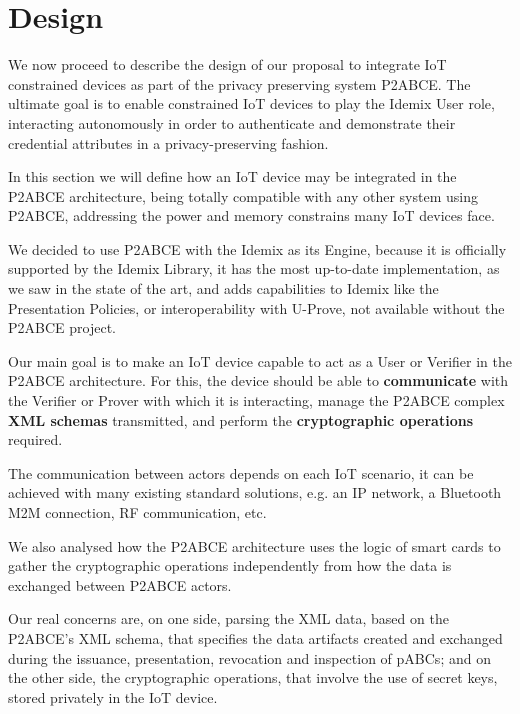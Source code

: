 \documentclass[journal]{IEEEtran}
\begin{document}
\section{Design}\label{ch:design}

We now proceed to describe the design of our proposal to integrate IoT constrained devices as part of the privacy preserving system P2ABCE. The ultimate goal is to enable constrained IoT devices to play the Idemix User role, interacting autonomously in order to authenticate and demonstrate their credential attributes in a privacy-preserving fashion.

In this section we will define how an IoT device may be integrated in the P2ABCE architecture, being totally compatible with any other system using P2ABCE, addressing the power and memory constrains many IoT devices face.

We decided to use P2ABCE with the Idemix as its Engine, because it is officially supported by the Idemix Library, it has the most up-to-date implementation, as we saw in the state of the art, and adds capabilities to Idemix like the Presentation Policies, or interoperability with U-Prove, not available without the P2ABCE project.

Our main goal is to make an IoT device capable to act as a User or Verifier in the P2ABCE architecture. For this, the device should be able to \textbf{communicate} with the Verifier or Prover with which it is interacting, manage the P2ABCE complex \textbf{XML schemas} transmitted, and perform the \textbf{cryptographic operations} required.

The communication between actors depends on each IoT scenario, it can be achieved with many existing standard solutions, e.g. an IP network, a Bluetooth M2M connection, RF communication, etc.

We also analysed how the P2ABCE architecture uses the logic of smart cards to gather the cryptographic operations independently from how the data is exchanged between P2ABCE actors.

Our real concerns are, on one side, parsing the XML data, based on the P2ABCE's XML schema, that specifies the data artifacts created and exchanged during the issuance, presentation, revocation and inspection of pABCs; and on the other side, the cryptographic operations, that involve the use of secret keys, stored privately in the IoT device.

\end{document}
